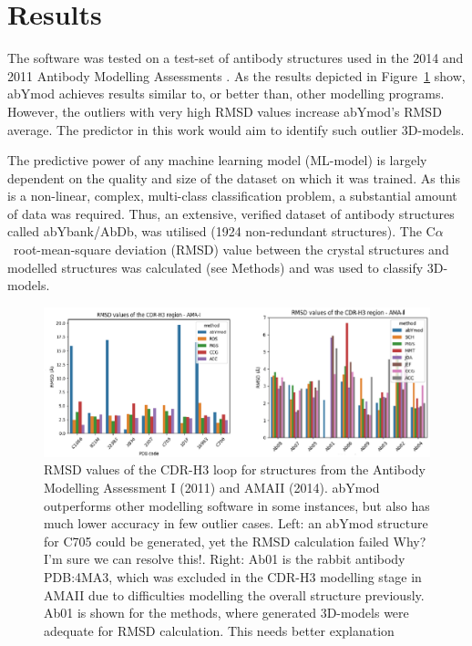 \documentclass[12pt]{article}
\newcommand{\ca}{\mbox{C$\alpha$}}
\newcommand{\lilian}[1]{ {\color{red}{\bfseries Lilian:} #1}}
\begin{document}
\section{Results}
The software
was tested on a test-set of antibody structures used in the 2014 and
2011 Antibody Modelling Assessments
\cite{Almagro2011,Almagro2014}. As the results depicted in
Figure~\ref{fig:AMA} show, abYmod achieves results similar to, or better than,
other modelling programs. However, the outliers with very high RMSD
values increase abYmod's RMSD average. The predictor in this work
would aim to identify such outlier 3D-models.

The predictive power of any machine learning model (ML-model) is largely
dependent on the quality and size of the dataset on which it was trained. As
this is a non-linear, complex, multi-class classification problem, a
substantial amount of data was required. Thus, an extensive, verified
dataset of antibody structures called abYbank/AbDb\cite{Ferdous2018},
was utilised (1924 non-redundant
structures). The \ca\ root-mean-square deviation (RMSD) value
between the crystal structures
and modelled structures was calculated (see Methods) and
was used to classify 3D-models.

\begin{figure}
  \centering
  \includegraphics[width=\linewidth]{AMA.eps}
  \caption {RMSD values of the CDR-H3 loop for structures from the
    Antibody Modelling Assessment I (2011) and AMAII (2014). abYmod
    outperforms other modelling software in some instances, but also
    has much lower accuracy in few outlier cases. Left: an abYmod
    structure for C705 could be generated, yet the RMSD calculation
    failed \lilian{Why? I'm sure we can resolve this!}.
    Right: Ab01 is the rabbit antibody PDB:4MA3, which was
    excluded in the CDR-H3 modelling stage in AMAII due to
    difficulties modelling the overall structure previously. Ab01 is
    shown for the methods, where generated 3D-models were adequate for
    RMSD calculation. \lilian{This needs better explanation}}
  \label{fig:AMA}
\end{figure}
\end{document}

